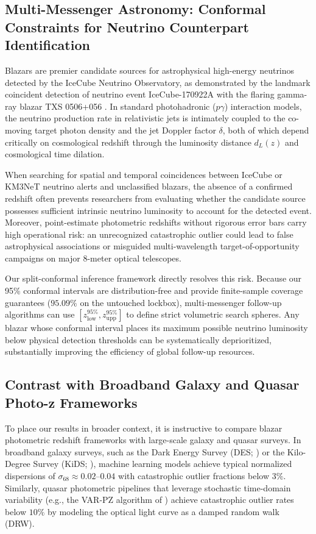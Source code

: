 \documentclass[twocolumn,linenumbers,floatfix]{aastex701}
\begin{document}
\subsection{Multi-Messenger Astronomy: Conformal Constraints for Neutrino Counterpart Identification}
\label{subsec:multimessenger}

Blazars are premier candidate sources for astrophysical high-energy neutrinos detected by the IceCube Neutrino Observatory, as demonstrated by the landmark coincident detection of neutrino event IceCube-170922A with the flaring gamma-ray blazar TXS 0506+056 \citep{IceCube2018, Ahnen2018}. In standard photohadronic ($p\gamma$) interaction models, the neutrino production rate in relativistic jets is intimately coupled to the co-moving target photon density and the jet Doppler factor $\delta$, both of which depend critically on cosmological redshift through the luminosity distance $d_L(z)$ and cosmological time dilation.

When searching for spatial and temporal coincidences between IceCube or KM3NeT neutrino alerts and unclassified blazars, the absence of a confirmed redshift often prevents researchers from evaluating whether the candidate source possesses sufficient intrinsic neutrino luminosity to account for the detected event. Moreover, point-estimate photometric redshifts without rigorous error bars carry high operational risk: an unrecognized catastrophic outlier could lead to false astrophysical associations or misguided multi-wavelength target-of-opportunity campaigns on major 8-meter optical telescopes.

Our split-conformal inference framework directly resolves this risk. Because our 95\% conformal intervals are distribution-free and provide finite-sample coverage guarantees ($95.09\%$ on the untouched lockbox), multi-messenger follow-up algorithms can use $[z_{\text{low}}^{95\%}, z_{\text{upp}}^{95\%}]$ to define strict volumetric search spheres. Any blazar whose conformal interval places its maximum possible neutrino luminosity below physical detection thresholds can be systematically deprioritized, substantially improving the efficiency of global follow-up resources.

\subsection{Contrast with Broadband Galaxy and Quasar Photo-z Frameworks}
\label{subsec:disc_comparisons}

To place our results in broader context, it is instructive to compare blazar photometric redshift frameworks with large-scale galaxy and quasar surveys. In broadband galaxy surveys, such as the Dark Energy Survey (DES; \citealt{Abdalla2025}) or the Kilo-Degree Survey (KiDS; \citealt{Kuijken2019}), machine learning models achieve typical normalized dispersions of $\sigma_{68} \approx 0.02$--$0.04$ with catastrophic outlier fractions below $3\%$. Similarly, quasar photometric pipelines that leverage stochastic time-domain variability (e.g., the VAR-PZ algorithm of \citealt{SatheeshSheeba2025}) achieve catastrophic outlier rates below $10\%$ by modeling the optical light curve as a damped random walk (DRW).
\end{document}
